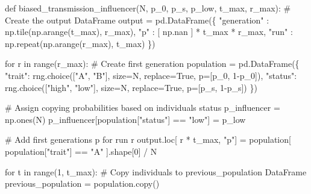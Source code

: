 \documentclass[
  a4paperpaper,
  ,captions=tableheading
]{scrbook}
\newenvironment{Shaded}{\begin{snugshade}}{\end{snugshade}}
\newcommand{\BuiltInTok}[1]{\textcolor[rgb]{0.00,0.23,0.31}{#1}}
\newcommand{\CommentTok}[1]{\textcolor[rgb]{0.37,0.37,0.37}{#1}}
\newcommand{\ControlFlowTok}[1]{\textcolor[rgb]{0.00,0.23,0.31}{#1}}
\newcommand{\DecValTok}[1]{\textcolor[rgb]{0.68,0.00,0.00}{#1}}
\newcommand{\KeywordTok}[1]{\textcolor[rgb]{0.00,0.23,0.31}{#1}}
\newcommand{\NormalTok}[1]{\textcolor[rgb]{0.00,0.23,0.31}{#1}}
\newcommand{\OperatorTok}[1]{\textcolor[rgb]{0.37,0.37,0.37}{#1}}
\newcommand{\StringTok}[1]{\textcolor[rgb]{0.13,0.47,0.30}{#1}}
\newcommand{\VariableTok}[1]{\textcolor[rgb]{0.07,0.07,0.07}{#1}}
\begin{document}
\begin{Shaded}
\begin{Highlighting}[]
\KeywordTok{def}\NormalTok{ biased\_transmission\_influencer(N, p\_0, p\_s, p\_low, t\_max, r\_max):}
    \CommentTok{\# Create the output DataFrame}
\NormalTok{    output }\OperatorTok{=}\NormalTok{ pd.DataFrame(\{}
        \StringTok{"generation"}\NormalTok{ : np.tile(np.arange(t\_max), r\_max),}
        \StringTok{"p"}\NormalTok{ : [ np.nan ] }\OperatorTok{*}\NormalTok{ t\_max }\OperatorTok{*}\NormalTok{ r\_max,}
        \StringTok{"run"}\NormalTok{ : np.repeat(np.arange(r\_max), t\_max)}
\NormalTok{    \})}
    
    \ControlFlowTok{for}\NormalTok{ r }\KeywordTok{in} \BuiltInTok{range}\NormalTok{(r\_max):}
            \CommentTok{\# Create first generation}
\NormalTok{            population }\OperatorTok{=}\NormalTok{ pd.DataFrame(\{}
                \StringTok{"trait"}\NormalTok{: rng.choice([}\StringTok{"A"}\NormalTok{, }\StringTok{"B"}\NormalTok{], size}\OperatorTok{=}\NormalTok{N, replace}\OperatorTok{=}\VariableTok{True}\NormalTok{, p}\OperatorTok{=}\NormalTok{[p\_0, }\DecValTok{1}\OperatorTok{{-}}\NormalTok{p\_0]),}
                \StringTok{"status"}\NormalTok{: rng.choice([}\StringTok{"high"}\NormalTok{, }\StringTok{"low"}\NormalTok{], size}\OperatorTok{=}\NormalTok{N, replace}\OperatorTok{=}\VariableTok{True}\NormalTok{, p}\OperatorTok{=}\NormalTok{[p\_s, }\DecValTok{1}\OperatorTok{{-}}\NormalTok{p\_s])}
\NormalTok{            \})}
            
            \CommentTok{\# Assign copying probabilities based on individuals\textquotesingle{} status}
\NormalTok{            p\_influencer }\OperatorTok{=}\NormalTok{ np.ones(N)}
\NormalTok{            p\_influencer[population[}\StringTok{"status"}\NormalTok{] }\OperatorTok{==} \StringTok{"low"}\NormalTok{] }\OperatorTok{=}\NormalTok{ p\_low}
            
            \CommentTok{\# Add first generation\textquotesingle{}s p for run r}
\NormalTok{            output.loc[ r }\OperatorTok{*}\NormalTok{ t\_max, }\StringTok{"p"}\NormalTok{] }\OperatorTok{=}\NormalTok{ population[ population[}\StringTok{"trait"}\NormalTok{] }\OperatorTok{==} \StringTok{"A"}\NormalTok{ ].shape[}\DecValTok{0}\NormalTok{] }\OperatorTok{/}\NormalTok{ N}
            
            \ControlFlowTok{for}\NormalTok{ t }\KeywordTok{in} \BuiltInTok{range}\NormalTok{(}\DecValTok{1}\NormalTok{, t\_max):}
                \CommentTok{\# Copy individuals to previous\_population DataFrame}
\NormalTok{                previous\_population }\OperatorTok{=}\NormalTok{ population.copy()}
                

\end{Highlighting}
\end{Shaded}
\end{document}
